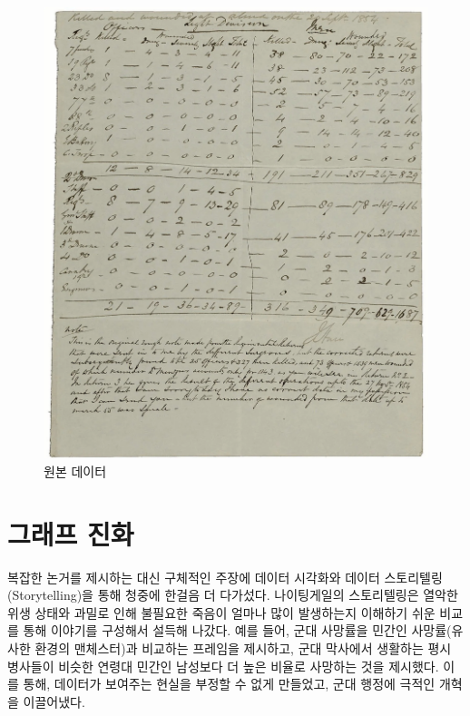 \documentclass[
  letterpaper,
  chapter,a4paper,showtrims,openright,hidelinks]{oblivoir}
\begin{document}
\begin{figure}

{\centering \includegraphics{images/nightingale_raw_data.png}

}

\caption{원본 데이터}

\end{figure}

\hypertarget{uxadf8uxb798uxd504-uxc9c4uxd654}{%
\section{그래프 진화}\label{uxadf8uxb798uxd504-uxc9c4uxd654}}

{}

복잡한 논거를 제시하는 대신 구체적인 주장에 데이터 시각화와 데이터
스토리텔링(Storytelling)을 통해 청중에 한걸음 더 다가섰다. 나이팅게일의
스토리텔링은 열악한 위생 상태와 과밀로 인해 불필요한 죽음이 얼마나 많이
발생하는지 이해하기 쉬운 비교를 통해 이야기를 구성해서 설득해 나갔다.
예를 들어, 군대 사망률을 민간인 사망률(유사한 환경의 맨체스터)과
비교하는 프레임을 제시하고, 군대 막사에서 생활하는 평시 병사들이 비슷한
연령대 민간인 남성보다 더 높은 비율로 사망하는 것을 제시했다. 이를 통해,
데이터가 보여주는 현실을 부정할 수 없게 만들었고, 군대 행정에 극적인
개혁을 이끌어냈다.
\end{document}
